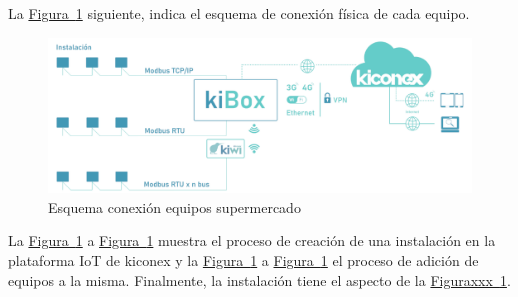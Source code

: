 La \hyperref[figura:esquemaConexion]{Figura~\ref{figura:esquemaConexion}} siguiente, indica el esquema de conexión física de cada equipo.

\begin{figure}[H]
  \centering
  \includegraphics[width=\textwidth, keepaspectratio]{img/esquemaConexion}
  \caption{Esquema conexión equipos supermercado}
  \label{figura:esquemaConexion}
\end{figure}

La \hyperref[figura:esquemaConexion]{Figura~\ref{figura:esquemaConexion}} a \hyperref[figura:esquemaConexion]{Figura~\ref{figura:esquemaConexion}} muestra el proceso de creación de una instalación en la plataforma IoT de kiconex y la \hyperref[figura:esquemaConexion]{Figura~\ref{figura:esquemaConexion}} a \hyperref[figura:esquemaConexion]{Figura~\ref{figura:esquemaConexion}} el proceso de adición de equipos a la misma. Finalmente, la instalación tiene el aspecto de la \hyperref[figura:esquemaConexion]{Figuraxxx~\ref{figura:esquemaConexion}}.